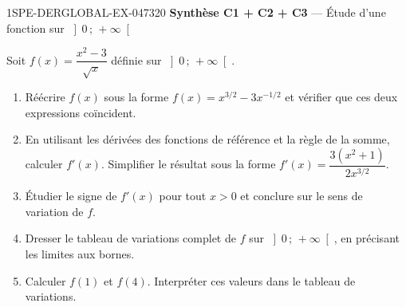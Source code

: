 \begin{exercice}{1SPE-DERGLOBAL-EX-047}{3}{20}
\textbf{Synthèse C1 + C2 + C3} — Étude d'une fonction sur $\left]0\,;\,+\infty\right[$

Soit $f(x) = \dfrac{x^2 - 3}{\sqrt{x}}$ définie sur $\left]0\,;\,+\infty\right[$.

\begin{enumerate}
  \item Réécrire $f(x)$ sous la forme $f(x) = x^{3/2} - 3x^{-1/2}$ et vérifier
        que ces deux expressions coïncident.
  \item En utilisant les dérivées des fonctions de référence et la règle de la somme,
        calculer $f'(x)$. Simplifier le résultat sous la forme
        $f'(x) = \dfrac{3(x^2+1)}{2x^{3/2}}$.
  \item Étudier le signe de $f'(x)$ pour tout $x > 0$ et conclure sur le sens de
        variation de $f$.
  \item Dresser le tableau de variations complet de $f$ sur $\left]0\,;\,+\infty\right[$,
        en précisant les limites aux bornes.
  \item Calculer $f(1)$ et $f(4)$. Interpréter ces valeurs dans le tableau de variations.
\end{enumerate}
\end{exercice}
